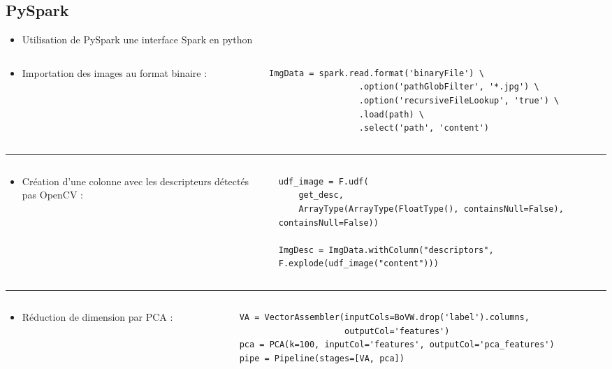 \documentclass[8pt,aspectratio=169,hyperref={unicode=true}]{beamer}
\begin{document}
\subsection{PySpark}
\begin{frame}[fragile]{\insertsubsection}
  \begin{itemize}
    \item Utilisation de PySpark une interface Spark en python
  \end{itemize}
  \begin{columns}
    \begin{column}{.25\textwidth}
      \begin{itemize}
        \item Importation des images au format binaire :
      \end{itemize}
    \end{column}
    \begin{column}{.75\textwidth}
      \begin{verbatim}
ImgData = spark.read.format('binaryFile') \
                  .option('pathGlobFilter', '*.jpg') \
                  .option('recursiveFileLookup', 'true') \
                  .load(path) \
                  .select('path', 'content')   
      \end{verbatim}
    \end{column}
  \end{columns}
  \vspace{3px}
  \hrule
  \begin{columns}
    \begin{column}{.25\textwidth}
      \begin{itemize}
        \item Création d'une colonne avec les descripteurs détectés pas OpenCV :
      \end{itemize}
    \end{column}
    \begin{column}{.75\textwidth}
      \begin{verbatim}
udf_image = F.udf(
    get_desc,
    ArrayType(ArrayType(FloatType(), containsNull=False), containsNull=False))

ImgDesc = ImgData.withColumn("descriptors", F.explode(udf_image("content")))  
      \end{verbatim}
    \end{column}
  \end{columns}
  \vspace{3px}
  \hrule
  \begin{columns}
    \begin{column}{.25\textwidth}
      \begin{itemize}
        \item Réduction de dimension par PCA :
      \end{itemize}
    \end{column}
    \begin{column}{.75\textwidth}
      \begin{verbatim}
VA = VectorAssembler(inputCols=BoVW.drop('label').columns,
                     outputCol='features')
pca = PCA(k=100, inputCol='features', outputCol='pca_features')
pipe = Pipeline(stages=[VA, pca])


\end{verbatim}
\end{column}
\end{columns}
\end{frame}
\end{document}
